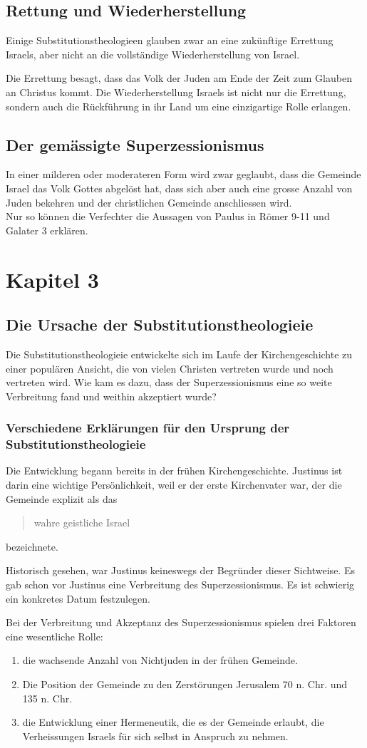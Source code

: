 \documentclass[fontsize=14pt]{../../inc/mybib}
\newcommand{\sz}{Superzessionismus}
\newcommand{\sts}{Substitutionstheologie}
\begin{document}
    \subsection{Rettung und Wiederherstellung}
    Einige \sts en glauben zwar an eine zukünftige Errettung Israels, aber nicht an die vollständige Wiederherstellung von Israel.

    Die Errettung besagt, dass das Volk der Juden am Ende der Zeit zum Glauben an Christus kommt.
    Die Wiederherstellung Israels ist nicht nur die Errettung, sondern auch die Rückführung in ihr Land um eine einzigartige Rolle erlangen.
    \subsection{Der gemässigte \sz}
    In einer milderen oder moderateren Form wird zwar geglaubt, dass die Gemeinde Israel das Volk Gottes abgelöst hat, dass sich aber auch eine grosse Anzahl von Juden bekehren und der christlichen Gemeinde anschliessen wird.\\
    Nur so können die Verfechter die Aussagen von Paulus in Römer 9-11 und Galater 3 erklären.
    \section{Kapitel 3}
    \subsection{Die Ursache der \sts ie}
    Die \sts ie entwickelte sich im Laufe der Kirchengeschichte zu einer populären Ansicht, die von vielen Christen vertreten wurde und noch vertreten wird. Wie kam es dazu, dass der \sz{} eine so weite Verbreitung fand und weithin akzeptiert wurde?
    \subsubsection{Verschiedene Erklärungen für den Ursprung der \sts ie}
    Die Entwicklung begann bereits in der frühen Kirchengeschichte. Justinus ist darin eine wichtige Persönlichkeit, weil er der erste Kirchenvater war, der die Gemeinde explizit als das \blockquote{wahre geistliche Israel} bezeichnete.

    Historisch gesehen, war Justinus keineswegs der Begründer dieser Sichtweise. Es gab schon vor Justinus eine Verbreitung des \sz. Es ist schwierig ein konkretes Datum festzulegen.

    Bei der Verbreitung und Akzeptanz des \sz{} spielen drei Faktoren eine wesentliche Rolle:
    \begin{enumerate}
        \item die wachsende Anzahl von Nichtjuden in der frühen Gemeinde.
        \item Die Position der Gemeinde zu den Zerstörungen Jerusalem 70 n. Chr. und 135 n. Chr.
        \item die Entwicklung einer Hermeneutik, die es der Gemeinde erlaubt, die Verheissungen Israels für sich selbst in Anspruch zu nehmen.
    \end{enumerate}
\end{document}
